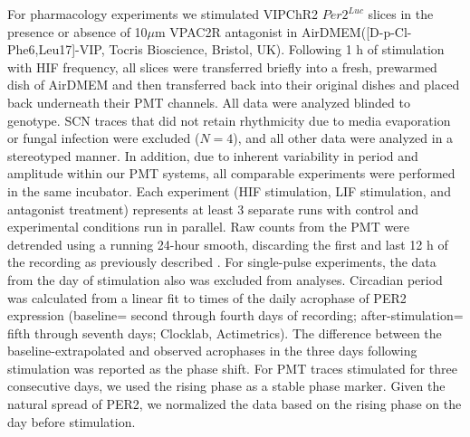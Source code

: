 For pharmacology experiments we stimulated VIPChR2 $Per2^{Luc}$ slices in the presence or absence of 10$\mu$m VPAC2R antagonist in AirDMEM([D-p-Cl-Phe6,Leu17]-VIP, Tocris Bioscience, Bristol, UK). 
Following 1 h of stimulation with HIF frequency, all slices were transferred briefly into a fresh, prewarmed dish of AirDMEM and then transferred back into their original dishes and placed back underneath their PMT channels.
All data were analyzed blinded to genotype.
SCN traces that did not retain rhythmicity due to media evaporation or fungal infection were excluded ($N=4$), and all other data were analyzed in a stereotyped manner.
In addition, due to inherent variability in period and amplitude within our PMT systems, all comparable experiments were performed in the same incubator.
Each experiment (HIF stimulation, LIF stimulation, and antagonist treatment) represents at least 3 separate runs with control and experimental conditions run in parallel.
Raw counts from the PMT were detrended using a running 24-hour smooth, discarding the first and last 12 h of the recording as previously described \cite{Herzog2015}.
For single-pulse experiments, the data from the day of stimulation also was excluded from analyses. Circadian period was calculated from a linear fit to times of the daily acrophase of PER2 expression (baseline= second through fourth days of recording; after-stimulation= fifth through seventh days; Clocklab, Actimetrics).
The difference between the baseline-extrapolated and observed acrophases in the three days following stimulation was reported as the phase shift.
For PMT traces stimulated for three consecutive days, we used the rising phase as a stable phase marker.
Given the natural spread of PER2, we normalized the data based on the rising phase on the day before stimulation. 

